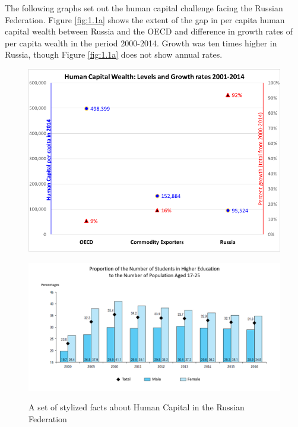 \documentclass[12pt,a4paper]{article}
\numberwithin{equation}{section}
\begin{document}
The following graphs set out the human capital challenge facing the Russian Federation. Figure \ref{fig:1.1a} shows the extent of the gap in per capita human capital wealth between Russia and the OECD and difference in growth rates of per capita wealth in the period 2000-2014. Growth was ten times higher in Russia, though Figure \ref{fig:1.1a} does not show annual rates. 
\begin{center}
	\begin{figure}[H]
		\begin{minipage}[b]{1\linewidth}
			\centering
			\hspace*{-0.7in}
			\includegraphics[width=400pt]{graph_1a.png}
			\label{fig:1.1a}
		\end{minipage}
		\hfill
		\begin{minipage}[b]{1\linewidth}
			\centering
			\hspace*{-0.7in}
			\includegraphics[width=500pt]{graph_1b.png}
			\label{fig:1.1b}
		\end{minipage}
		\hfill
		\caption{A set of stylized facts about Human Capital in the Russian Federation}\label{fig:1.1}
	\end{figure}
\end{center}
\end{document}

